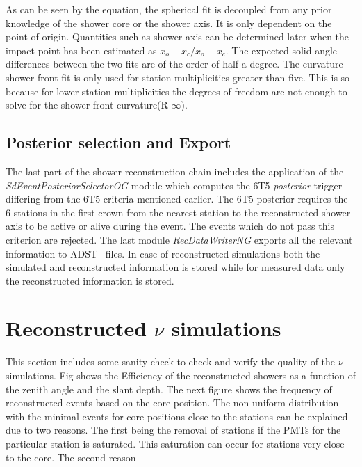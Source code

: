 As can be seen by the equation, the spherical fit is decoupled from any prior knowledge of the shower core or the shower axis. It is only dependent on the point of origin. Quantities such as shower axis can be determined later when the impact point has been estimated as $x_o -x_c/ x_o-x_c$. The expected solid angle differences between the two fits are of the order of half a degree. The curvature shower front fit is only used for station multiplicities greater than five. This is so because for lower station multiplicities the degrees of freedom are not enough to solve for the shower-front curvature(R-$\infty$). 


\subsection{Posterior selection and Export}
\label{subsec:reco_possel}

The last part of the shower reconstruction chain includes the application of the \textit{SdEventPosteriorSelectorOG} module which computes the 6T5 \textit{posterior} trigger differing from the 6T5 criteria mentioned earlier. The 6T5 posterior requires the 6 stations in the first crown from the nearest station to the reconstructed shower axis to be active or alive during the event. The events which do not pass this criterion are rejected. The last module \textit{RecDataWriterNG} exports all the relevant information to ADST~\cite{} files. In case of reconstructed simulations both the simulated and reconstructed information is stored while for measured data only the reconstructed information is stored.


\section{Reconstructed $\nu$ simulations}
\label{sec:reco_possel}
This section includes some sanity check to check and verify the quality of the $\nu$ simulations. Fig shows the  Efficiency of the reconstructed showers as a function of the zenith angle and the slant depth. The next figure shows the frequency of reconstructed events based on the core position. The non-uniform distribution with the minimal events for core positions close to the stations can be explained due to two reasons. The first being the removal of stations if the PMTs for the particular station is saturated. This saturation can occur for stations very close to the core. The second reason  



